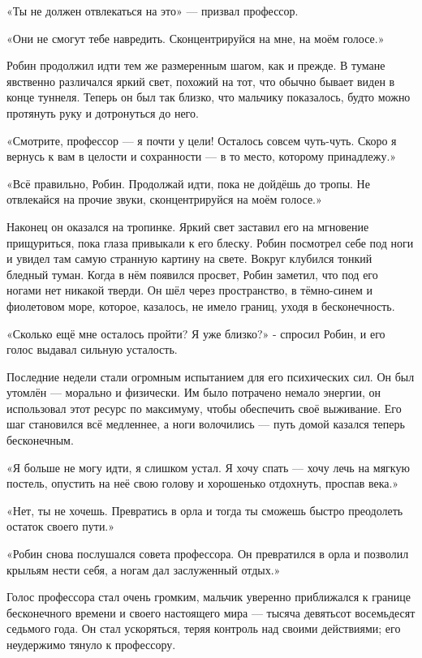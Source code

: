 \documentclass[a5paper, 9pt,
final, openany, twoside=true]{memoir}
\begin{document}
«Ты не должен отвлекаться на это» — призвал профессор.

«Они не смогут тебе навредить. Сконцентрируйся на мне, на моём голосе.»

Робин продолжил идти тем же размеренным шагом, как и прежде. В тумане явственно различался яркий свет, похожий на тот, что обычно бывает виден в конце туннеля. Теперь он был так близко, что мальчику показалось, будто можно протянуть руку и дотронуться до него.

«Смотрите, профессор — я почти у цели! Осталось совсем чуть-чуть. Скоро я вернусь к вам в целости и сохранности — в то место, которому принадлежу.»

«Всё правильно, Робин. Продолжай идти, пока не дойдёшь до тропы. Не отвлекайся на прочие звуки, сконцентрируйся на моём голосе.»\bigskip

Наконец он оказался на тропинке. Яркий свет заставил его на мгновение прищуриться, пока глаза привыкали к его блеску. Робин посмотрел себе под ноги и увидел там самую странную картину на свете. Вокруг клубился тонкий бледный туман. Когда в нём появился просвет, Робин заметил, что под его ногами нет никакой тверди. Он шёл через пространство, в тёмно-синем и фиолетовом море, которое, казалось, не имело границ, уходя в бесконечность.

«Сколько ещё мне осталось пройти? Я уже близко?» - спросил Робин, и его голос выдавал сильную усталость.

Последние недели стали огромным испытанием для его психических сил. Он был утомлён — морально и физически. Им было потрачено немало энергии, он использовал этот ресурс по максимуму, чтобы обеспечить своё выживание. Его шаг становился всё медленнее, а ноги волочились — путь домой казался теперь бесконечным.

«Я больше не могу идти, я слишком устал. Я хочу спать — хочу лечь на мягкую постель, опустить на неё свою голову и хорошенько отдохнуть, проспав века.»

«Нет, ты не хочешь. Превратись в орла и тогда ты сможешь быстро преодолеть остаток своего пути.» 

«Робин снова послушался совета профессора. Он превратился в орла и позволил крыльям нести себя, а ногам дал заслуженный отдых.»

Голос профессора стал очень громким, мальчик уверенно приближался к границе бесконечного времени и своего настоящего мира — тысяча девятьсот восемьдесят седьмого года. Он стал ускоряться, теряя контроль над своими действиями; его неудержимо тянуло к профессору.
\end{document}
